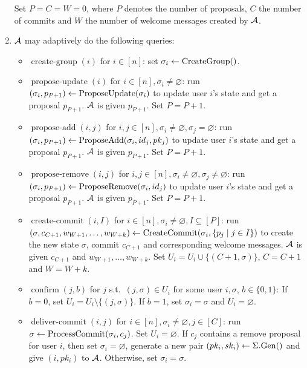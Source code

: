 \begin{definition}
\begin{enumerate}[1.]
		      Set $P = C = W = 0$, where $P$ denotes the number of proposals, $C$ the number of commits and $W$ the number of welcome messages created by $\mathcal{A}$.
		\item $\mathcal{A}$ may adaptively do the following queries:
		      \begin{itemize}
			      \item $\operatorname{create-group}(i)$ for $i \in [n]$: set $\sigma_i \leftarrow \operatorname{CreateGroup}()$.
			      \item $\operatorname{propose-update}(i)$ for $i \in [n], \sigma_i \neq \varnothing$: run $(\sigma_i, p_{P + 1}) \leftarrow \operatorname{ProposeUpdate}(\sigma_i)$ to update user $i$'s state and get a proposal $p_{P + 1}$. $\mathcal{A}$ is given $p_{P + 1}$. Set $P = P + 1$.
			      \item $\operatorname{propose-add}(i, j)$ for $i, j \in [n], \sigma_i \neq \varnothing, \sigma_j = \varnothing$: run $(\sigma_i, p_{P + 1}) \leftarrow \operatorname{ProposeAdd}(\sigma_i, id_j, pk_j)$ to update user $i$'s state and get a proposal $p_{P + 1}$. $\mathcal{A}$ is given $p_{P + 1}$. Set $P = P + 1$.
			      \item $\operatorname{propose-remove}(i, j)$ for $i, j \in [n], \sigma_i \neq \varnothing, \sigma_j \neq \varnothing$: run $(\sigma_i, p_{P + 1}) \leftarrow \operatorname{ProposeRemove}(\sigma_i, id_j)$ to update user $i$'s state and get a proposal $p_{P + 1}$. $\mathcal{A}$ is given $p_{P + 1}$. Set $P = P + 1$.
			      \item $\operatorname{create-commit}(i, I)$ for $i \in [n], \sigma_i \neq \varnothing, I \subseteq [P]$: run $(\sigma, c_{C + 1}, w_{W + 1}, \ldots, w_{W + k}) \leftarrow \operatorname{CreateCommit}(\sigma_i, \{p_j \mid j \in I\})$ to create the new state $\sigma$, commit $c_{C + 1}$ and corresponding welcome messages. $\mathcal{A}$ is given $c_{C + 1}$ and $w_{W + 1}, \ldots, w_{W + k}$. Set $U_i = U_i \cup \{(C + 1, \sigma)\}$, $C = C + 1$ and $W = W + k$.
			      \item $\operatorname{confirm}(j, b)$ for $j$ s.t.~$(j, \sigma) \in U_i$ for some user $i, \sigma$, $b \in \{0, 1\}$: If $b = 0$, set $U_i = U_i \setminus \{(j, \sigma)\}$. If $b = 1$, set $\sigma_i = \sigma$ and $U_i = \varnothing$.
			      \item $\operatorname{deliver-commit}(i, j)$ for $i \in [n], \sigma_i \neq \varnothing, j \in [C]$: run $\sigma \leftarrow \operatorname{ProcessCommit}(\sigma_i, c_j)$. Set $U_i = \varnothing$. If $c_j$ contains a remove proposal for user $i$, then set $\sigma_i = \varnothing$, generate a new pair $(pk_i, sk_i) \leftarrow \Sigma.\mathrm{Gen}()$ and give $(i, pk_i)$ to $\mathcal{A}$. Otherwise, set $\sigma_i = \sigma$.

\end{itemize}
\end{enumerate}
\end{definition}

